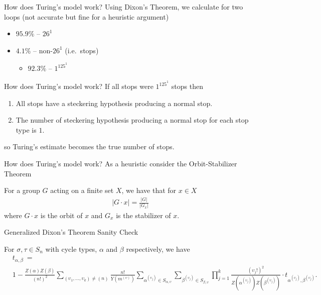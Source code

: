 \documentclass[hyphens,aspectratio=169]{beamer}
\begin{document}
\begin{frame}[fragile]{How does Turing's model work?}
Using Dixon's Theorem, we calculate for two loops (not accurate but fine for a heuristic argument)
\begin{itemize}
    \item $95.9\%$ -- $26^1$
    \item  $4.1\%$ -- non-$26^1$ (i.e.\ stops)
    \begin{itemize}
        \item $92.3\%$ -- $1^125^1$
    \end{itemize}
\end{itemize}
\end{frame}

\begin{frame}[fragile]{How does Turing's model work?}
If all stops were $1^125^1$ stops then
\begin{enumerate}
  \item All stops have a steckering hypothesis producing a normal stop.
  \item The number of steckering hypothesis producing a normal stop
    for each stop type is $1$.
\end{enumerate}
so Turing's estimate becomes the true number of stops.
\end{frame}

\begin{frame}[fragile]{How does Turing's model work?}
As a heuristic consider the Orbit-Stabilizer Theorem 
\begin{theorem}
  For a group $G$ acting on a finite set $X$, we have that for $x\in X$
  \begin{align*}
    |G\cdot x| = \frac{|G|}{|G_x|}
  \end{align*}
  where $G\cdot x$ is the orbit of $x$ and $G_x$ is the stabilizer of $x$.
\end{theorem}
\end{frame}


\begin{frame}[fragile]{Generalized Dixon's Theorem Sanity Check}
\begin{theorem}
  For $\sigma,\tau\in S_n$ with cycle types, $\alpha$ and $\beta$
  respectively, we have
  \begin{align*}
    &t_{\alpha, \beta}\ = 
    \\&1 -
    \frac{Z(\alpha)Z(\beta)}{(n!)^2}\sum_{(\upsilon_1,\dots,\upsilon_k)\ne(n)}\frac{n!}{Y(m^{(\upsilon)})}\sum_{\alpha^{(\upsilon_j)}\in
    S_{\alpha,\upsilon}}\sum_{\beta^{(\upsilon_j)}\in
    S_{\beta,\upsilon}}\prod_{j=1}^k
    {\frac{(\upsilon_j!)^2}{Z(\alpha^{(\upsilon_j)})Z(\beta^{(\upsilon_j)})}}\cdot
    t_{\alpha^{(\upsilon_j)},\beta^{(\upsilon_j)}}.
  \end{align*}
\end{theorem}
\end{frame}
\end{document}
